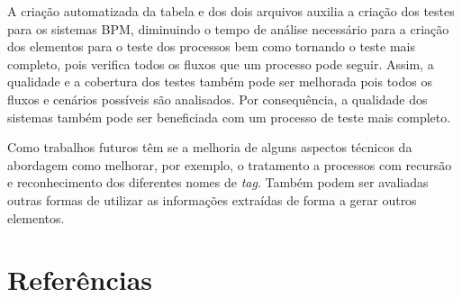\documentclass[12pt]{article}
\begin{document}
A criação automatizada da tabela e dos dois arquivos auxilia a criação dos testes para os sistemas BPM, diminuindo o tempo de análise necessário para a criação dos elementos para o teste dos processos bem como tornando o teste mais completo, pois verifica todos os fluxos que um processo pode seguir. Assim, a qualidade e a cobertura dos testes também pode ser melhorada pois todos os fluxos e cenários possíveis são analisados. Por consequência, a qualidade dos sistemas também pode ser beneficiada com um processo de teste mais completo.

Como trabalhos futuros têm se a melhoria de alguns aspectos técnicos da abordagem como melhorar, por exemplo, o tratamento a processos com recursão e reconhecimento dos diferentes nomes de \emph{tag}. Também podem ser avaliadas outras formas de utilizar as informações extraídas de forma a gerar outros elementos.
 

\section{Referências}



\end{document}
